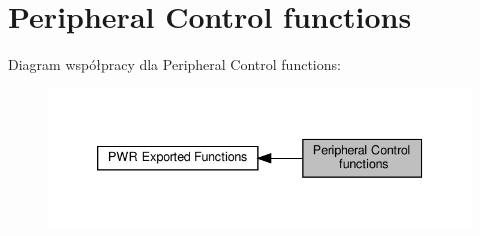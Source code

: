 \hypertarget{group___p_w_r___exported___functions___group2}{}\section{Peripheral Control functions}
\label{group___p_w_r___exported___functions___group2}
Diagram współpracy dla Peripheral Control functions\+:\nopagebreak
\begin{figure}[H]
\begin{center}
\leavevmode
\includegraphics[width=339pt]{group___p_w_r___exported___functions___group2}
\end{center}
\end{figure}
